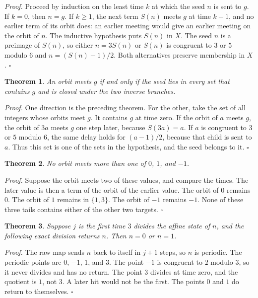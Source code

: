 \documentclass[11pt,letterpaper]{article}
\newtheorem{theorem}{Theorem}
\newenvironment{proof}{\noindent\textit{Proof.}}{\hfill\(\square\)}
\begin{document}
\begin{proof}
Proceed by induction on the least time \(k\) at which the seed \(n\) is sent to \(g\). If \(k=0\), then \(n=g\). If \(k\ge 1\), the next term \(S(n)\) meets \(g\) at time \(k-1\), and no earlier term of its orbit does: an earlier meeting would give an earlier meeting on the orbit of \(n\). The inductive hypothesis puts \(S(n)\) in \(X\). The seed \(n\) is a preimage of \(S(n)\), so either \(n=3S(n)\) or \(S(n)\) is congruent to \(3\) or \(5\) modulo \(6\) and \(n=(S(n)-1)/2\). Both alternatives preserve membership in \(X\).
\end{proof}

\begin{theorem}
\label{thm:iffgenerated}
An orbit meets \(g\) if and only if the seed lies in every set that contains \(g\) and is closed under the two inverse branches.
\end{theorem}

\begin{proof}
One direction is the preceding theorem. For the other, take the set of all integers whose orbits meet \(g\). It contains \(g\) at time zero. If the orbit of \(a\) meets \(g\), the orbit of \(3a\) meets \(g\) one step later, because \(S(3a)=a\). If \(a\) is congruent to \(3\) or \(5\) modulo \(6\), the same delay holds for \((a-1)/2\), because that child is sent to \(a\). Thus this set is one of the sets in the hypothesis, and the seed belongs to it.
\end{proof}

\begin{theorem}
\label{thm:exclusive}
No orbit meets more than one of \(0\), \(1\), and \(-1\).
\end{theorem}

\begin{proof}
Suppose the orbit meets two of these values, and compare the times. The later value is then a term of the orbit of the earlier value. The orbit of \(0\) remains \(0\). The orbit of \(1\) remains in \(\{1,3\}\). The orbit of \(-1\) remains \(-1\). None of these three tails contains either of the other two targets.
\end{proof}

\begin{theorem}
\label{thm:returnfixed}
Suppose \(j\) is the first time \(3\) divides the affine state of \(n\), and the following exact division returns \(n\). Then \(n=0\) or \(n=1\).
\end{theorem}

\begin{proof}
The raw map sends \(n\) back to itself in \(j+1\) steps, so \(n\) is periodic. The periodic points are \(0\), \(-1\), \(1\), and \(3\). The point \(-1\) is congruent to \(2\) modulo \(3\), so it never divides and has no return. The point \(3\) divides at time zero, and the quotient is \(1\), not \(3\). A later hit would not be the first. The points \(0\) and \(1\) do return to themselves.
\end{proof}
\end{document}
